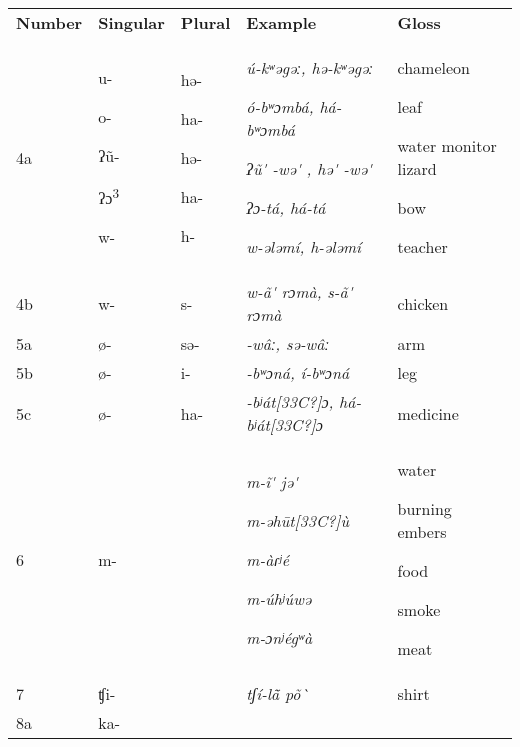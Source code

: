 \documentclass[output=paper]{langsci/langscibook}
\begin{document}
\begin{tabularx}{\textwidth}{XXXXX}
\lsptoprule
\textbf{Number} & \textbf{Singular} & \textbf{Plural} & \textbf{Example} & \textbf{Gloss}\\
4a & u-

o-

ʔũ{}-

ʔɔ\textsuperscript{3}

w- & hə-

ha-

hə-

ha-

h- & \textit{ú-kʷəgəː, hə-kʷəgəː}

\textit{ó-bʷɔmbá, há-bʷɔmbá}

\textit{ʔũ\'{} -wə\'{} , hə\'{} -wə\'{} } 

\textit{ʔɔ{}-tá, há-tá}

\textit{w-ələmí, h-ələmí} & chameleon

leaf

water monitor lizard

bow

teacher \\
4b & w- & s- & \textit{w-ã\'{} rɔmà, s-ã\'{} rɔmà} & chicken\\
5a & ø- & sə- & \textit{{}-wâː, sə-wâː} & arm\\
5b & ø- & i- & \textit{{}-bʷɔná, í-bʷɔná} & leg\\
5c & ø- & ha- & \textit{{}-bʲát[33C?]ɔ, há-bʲát[33C?]ɔ} & medicine\\
6 & m- &  & \textit{m-ĩ\'{} jə\'{} }

\textit{m-əhūt[33C?]ù} 

\textit{m-àɾʲé}

\textit{m-úhʲúwə} 

\textit{m-ɔnʲégʷà} & water

burning embers

food

smoke

meat\\
7 & ʧi- &  & \textit{tʃí-lã\={} põ\`{} } & shirt\\
8a & ka-


\end{tabularx}
\end{document}
